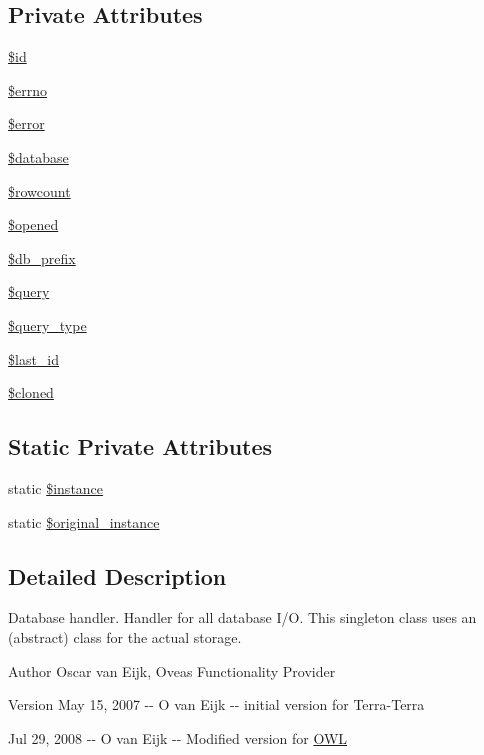 \subsection*{Private Attributes}
\begin{DoxyCompactItemize}
\item 
\hyperlink{classDbHandler_ad38e1c3312815c8ad4093957881092ff}{\$id}
\item 
\hyperlink{classDbHandler_af6e9f493be56617cb533763bb2a0e85a}{\$errno}
\item 
\hyperlink{classDbHandler_ade79e11156abbfc180864beb5b9df377}{\$error}
\item 
\hyperlink{classDbHandler_afaac5248f9ee59786b48a7b51f318940}{\$database}
\item 
\hyperlink{classDbHandler_a56a7ae4bd7d842c85f3fe8052aecbfef}{\$rowcount}
\item 
\hyperlink{classDbHandler_a71e36ffbff0d157b1d91dc000bc6f821}{\$opened}
\item 
\hyperlink{classDbHandler_a19af96598e7f72673fc5da26ad77731b}{\$db\_\-prefix}
\item 
\hyperlink{classDbHandler_ad671b5596b37dac6d48a660a07775965}{\$query}
\item 
\hyperlink{classDbHandler_afba491ae1a1f1b9343cb65c87ef1e2a9}{\$query\_\-type}
\item 
\hyperlink{classDbHandler_aaa5ed1e6f29e1faa49c503ba9b3134ac}{\$last\_\-id}
\item 
\hyperlink{classDbHandler_a6fc74f6785f349ab442f33ce31f46e63}{\$cloned}
\end{DoxyCompactItemize}
\subsection*{Static Private Attributes}
\begin{DoxyCompactItemize}
\item 
static \hyperlink{classDbHandler_a0859a862eac3e8ba14c6d04de0396710}{\$instance}
\item 
static \hyperlink{classDbHandler_a495ca4030e7ca7d5e8c7e2604e042dfe}{\$original\_\-instance}
\end{DoxyCompactItemize}


\subsection{Detailed Description}
Database handler. Handler for all database I/O. This singleton class uses an (abstract) class for the actual storage. \begin{DoxyAuthor}{Author}
Oscar van Eijk, Oveas Functionality Provider 
\end{DoxyAuthor}
\begin{DoxyVersion}{Version}
May 15, 2007 -\/-\/ O van Eijk -\/-\/ initial version for Terra-\/Terra 

Jul 29, 2008 -\/-\/ O van Eijk -\/-\/ Modified version for \hyperlink{classOWL}{OWL} 
\end{DoxyVersion}


